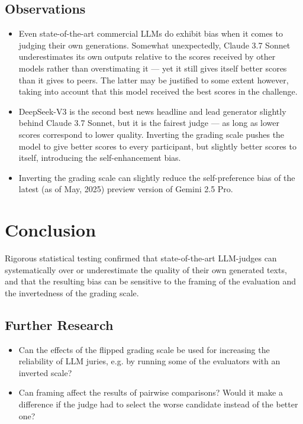 \documentclass[UTF8,noindent,nohyp,parspace,titlepage,twoside,12pt]{article}
\begin{document}
    \subsection{Observations}

      \begin{itemize}
        \item Even state-of-the-art commercial LLMs do exhibit bias when it
              comes to judging their own generations. Somewhat unexpectedly,
              Claude 3.7 Sonnet underestimates its own outputs relative to the
              scores received by other models rather than overstimating it ---
              yet it still gives itself better scores than it gives to peers.
              The latter may be justified to some extent however, taking into
              account that this model received the best scores in the
              challenge.

        \item DeepSeek-V3 is the second best news headline and lead generator
              slightly behind Claude 3.7 Sonnet, but it is the fairest judge
              --- as long as lower scores correspond to lower quality. Inverting
              the grading scale pushes the model to give better scores to every
              participant, but slightly better scores to itself, introducing the
              self-enhancement bias.

        \item Inverting the grading scale can slightly reduce the
              self-preference bias of the latest (as of May, 2025) preview
              version of Gemini 2.5 Pro.
      \end{itemize}

  \section{Conclusion}

    Rigorous statistical testing confirmed that state-of-the-art LLM-judges can
    systematically over or underestimate the quality of their own generated
    texts, and that the resulting bias can be sensitive to the framing of the
    evaluation and the invertedness of the grading scale.

    \subsection{Further Research}

      \begin{itemize}
        \item Can the effects of the flipped grading scale be used for
              increasing the reliability of LLM juries, e.g. by running some of
              the evaluators with an inverted scale?

        \item Can framing affect the results of pairwise comparisons? Would it
              make a difference if the judge had to select the worse candidate
              instead of the better one?
      \end{itemize}
\end{document}
